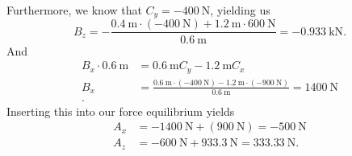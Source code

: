 \begin{derivation}
  Furthermore, we know that $C_y = -\qty{400}{\N} $, yielding us
  \begin{equation*}
    B_z = - \frac{\qty{0.4}{\m} \cdot (- \qty{400}{\N} ) + \qty{1.2}{\m} \cdot \qty{600}{\N}}{\qty{0.6}{\m} } = \qty{-0.933}{\kN}
  .\end{equation*}
  And
  \begin{align*}
    B_x \cdot \qty{0,6}{\m} &= \qty{0,6}{\m} C_y - \qty{1,2}{\m} C_x \\
    B_x &= \frac{\qty{0.6}{\m} \cdot (- \qty{400}{\N} ) - \qty{1.2}{\m} \cdot \left( - \qty{900}{\N}  \right)}{\qty{0.6}{\m} }  = \qty{1400}{\N}\\
  .\end{align*}
  Inserting this into our force equilibrium yields
  \begin{align*}
    A_x &= - \qty{1400}{\N} + \left( \qty{900}{\N}  \right) = -\qty{500}{\N} \\
    A_z &= - \qty{600}{\N} + \qty{933.3}{\N} = \qty{333,33}{\N}
  .\end{align*}
\end{derivation}


